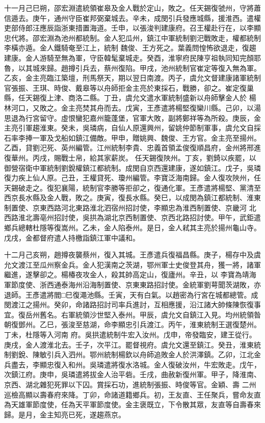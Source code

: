 \begin{pinyinscope}
 十一月己巳朔，邵宏淵遣統領崔皋及金人戰於定山，敗之。任天錫復虢州，守將蕭信遁去。庚午，通州守臣崔邦弼棄城去。辛未，成閔引兵發應城縣，援淮西。遣權吏部侍郎汪應辰詣浙東措置海道。壬申，以張浚判建康府。召王權赴行在，以李顯忠代將。邵宏淵為池州都統制。金人犯瓜州，鎮江中軍統制劉汜戰敗走，權都統制李橫亦遁。金人鐵騎奄至江上，統制
 魏俊、王方死之。葉義問惶怖欲退走，復趨建康。金人游騎至無為軍，守臣韓髦棄城走。癸酉，淮寧府民陳亨祖執同知完顏耶魯，以其城來歸。趙撙引兵去，蔡州復陷。甲戌，池州統制官崔定等復入無為軍。乙亥，金主亮臨江築壇，刑馬祭天，期以翌日南渡。丙子，虞允文督建康諸軍統制官張振、王琪、時俊、戴皋等以舟師拒金主亮於東採石，戰勝，卻之。崔定復巢縣，任天錫復上津、商洛二縣。丁丑，虞允文遣水軍統制盛新以舟師擊金人於
 楊林河口，又敗之。金主亮焚其舟而去。戊寅，王彥遣將楊堅復欒川縣。己卯，以湯思退為行宮留守。虛恨蠻犯嘉州籠蓬堡，官軍大敗，副將鄭祥等為所殺。庚辰，金主亮引軍趨淮東。癸未，吳璘病，自仙人原還興州，留姚仲節制軍事，虞允文自採石率李捧一軍及戈船如鎮江備敵。甲申，贈姚興、魏俊、王方官。金主亮至揚州。乙酉，貸劉汜死、英州編管。江州統制李貴、忠義首領孟俊復順昌府，金州將邢進復華州。丙戌，賜戰士帛，給其家薪炭。
 任天錫復陜州。丁亥，劉錡以疾罷，以御營宿衛中軍統制劉銳權鎮江都統制。成閔自京西還建康，遂如鎮江。戊子，吳璘復力疾上仙人原。己丑，王權貸死、瓊州編管。李寶泛海南歸。金人復攻陜州，任天錫破走之。復犯襄陽，統制官李勝等拒卻之，復通化軍。王彥遣將楊堅、黨清至西京長水縣及金人戰，敗之。庚寅，復長水縣。癸巳，以成閔為鎮江都統制、淮東制置使、京東西路河北東路淮北泗宿州招討使，李顯忠為淮西制置使、京畿河
 北西路淮北壽亳州招討使，吳拱為湖北京西制置使、京西北路招討使。甲午，武鉅遣鄉兵總轄杜隱等復嵩州。乙未，金人陷泰州。是日，金人弒其主亮於揚州龜山寺。戊戌，金都督府遣人持檄詣鎮江軍中議和。



 十二月己亥朔，趙撙夜襲蔡州，復入其城。王彥遣兵復福昌縣。庚子，楊存中及虞允文渡江至瓜州察金兵。金人犯漢南之茨湖，鄂州軍士史俊登其舟，獲一將，諸軍繼進，遂擊卻之。楊椿夜攻金人，殺其帥高定山，復廬州。辛丑，以
 李寶為靖海軍節度使、浙西通泰海州沿海制置使、京東東路招討使。金統軍劉萼聞茨湖敗，亦退師。王彥遣將閻□巳復澠池縣。壬寅，天有白氣。以趙密為行宮在城都總管。成閔渡江之揚州。癸卯，命諸路招討司率兵進討，互相應援，沿江諸大帥條陳恢復事宜。復岳州舊名。右軍統領沙世堅入泰州。甲辰，虞允文自鎮江入見。均州統領昝朝復鄧州。乙巳，張浚至慈湖，命李顯忠引兵渡江。丙午，淮東統制王選復楚州。丁未，杜隱等入河南
 府。吳拱遣統制牛宏入汝州。戊申，帝發臨安，建王從行。庚戌，金人渡淮北去。壬子，次平江。罷督視府。虞允文還至鎮江。癸丑，淮東統制劉銳、陳敏引兵入泗州。鄂州統制楊欽以舟師追敗金人於洪澤鎮。乙卯，江北金兵盡去，李顯忠復入和州。吳璘遣將復水洛城。金人復破汝州，牛宏敗走。戊午，次鎮江府。庚申，吳璘遣將拔金人治平砦。壬戌，曲赦新復州軍。甲子，降淮南、京西、湖北雜犯死罪以下囚。賞採石功，進統制張振、時俊等官。金穎、壽
 二州巡檢高顯以壽春府來降。丁卯，命諸道籍鄉兵。初，王友直、王任聚兵，嘗命友直為天雄軍節度使，任為天平軍節度使。金主褒既立，下令散其眾，友直等自壽春來歸。是月，金主知亮已死，遂趨燕京。




\end{pinyinscope}
